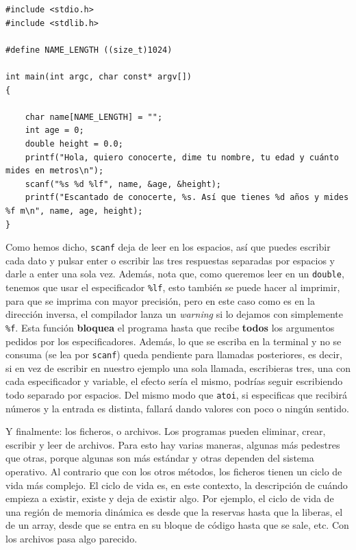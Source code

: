 \documentclass[a4paper]{article}
\begin{document}
\noindent
\begin{minipage}[H]{\linewidth}
\mbox{}
\begin{lstlisting}[style=C,
caption={Ejemplo avanzado de \texttt{scanf}},
label={lst:scanfExample}]
#include <stdio.h>
#include <stdlib.h>

#define NAME_LENGTH ((size_t)1024)

int main(int argc, char const* argv[])
{

    char name[NAME_LENGTH] = "";
    int age = 0;
    double height = 0.0;
    printf("Hola, quiero conocerte, dime tu nombre, tu edad y cuánto mides en metros\n");
    scanf("%s %d %lf", name, &age, &height);
    printf("Escantado de conocerte, %s. Así que tienes %d años y mides %f m\n", name, age, height);
}
\end{lstlisting}
\end{minipage}

Como hemos dicho, \verb!scanf! deja de leer en los espacios, así que puedes
escribir cada dato y pulsar enter o escribir las tres respuestas separadas
por espacios y darle a enter una sola vez. Además, nota que, como queremos
leer en un \verb!double!, tenemos que usar el especificador \verb!%lf!, esto
también se puede hacer al imprimir, para que se imprima con mayor precisión,
pero en este caso como es en la dirección inversa, el compilador lanza un
\emph{warning} si lo dejamos con simplemente \verb!%f!. Esta función
\textbf{bloquea} el programa hasta que recibe \textbf{todos} los argumentos
pedidos por los especificadores. Además, lo que se escriba en la terminal y
no se consuma (se lea por \verb!scanf!) queda pendiente para llamadas
posteriores, es decir, si en vez de escribir en nuestro ejemplo una sola
llamada, escribieras tres, una con cada especificador y variable, el efecto
sería el mismo, podrías seguir escribiendo todo separado por espacios. Del
mismo modo que \verb!atoi!, si especificas que recibirá números y la entrada
es distinta, fallará dando valores con poco o ningún sentido.

Y finalmente: los ficheros, o archivos. Los programas pueden eliminar, crear,
escribir y leer de archivos. Para esto hay varias maneras, algunas más pedestres
que otras, porque algunas son más estándar y otras dependen del sistema
operativo. Al contrario que con los otros métodos, los ficheros tienen un
ciclo de vida más complejo. El ciclo de vida es, en este contexto, la descripción
de cuándo empieza a existir, existe y deja de existir algo. Por ejemplo,
el ciclo de vida de una región de memoria dinámica es desde que la reservas
hasta que la liberas, el de un array, desde que se entra en su bloque de código
hasta que se sale, etc. Con los archivos pasa algo parecido.
\end{document}
